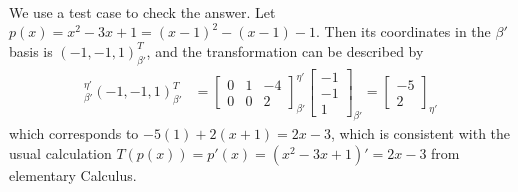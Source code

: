 \begin{solution}
\begin{align*}
\end{align*}
We use a test case to check the answer. Let $p(x) = x^2 - 3x + 1 = (x-1)^2 - (x-1) - 1$. Then its coordinates in the $\mathcal{\beta}'$ basis is $(-1,-1,1)^T_{\beta'}$, and the transformation can be described by 
\begin{align*}
[T]_{\beta'}^{\eta'} (-1,-1,1)^T_{\beta'} &= 
\begin{bmatrix}
0 & 1 & -4 \\
0 & 0 & 2
\end{bmatrix}_{\beta'}^{\eta'}
\begin{bmatrix}
-1 \\
-1 \\
1
\end{bmatrix}_{\beta'}
=
\begin{bmatrix}
-5 \\
2
\end{bmatrix}_{\eta'}
\end{align*}
which corresponds to $-5(1) + 2(x+1) = 2x-3$, which is consistent with the usual calculation $T(p(x)) = p'(x) = (x^2-3x+1)' = 2x-3$ from elementary Calculus.
\end{solution}

